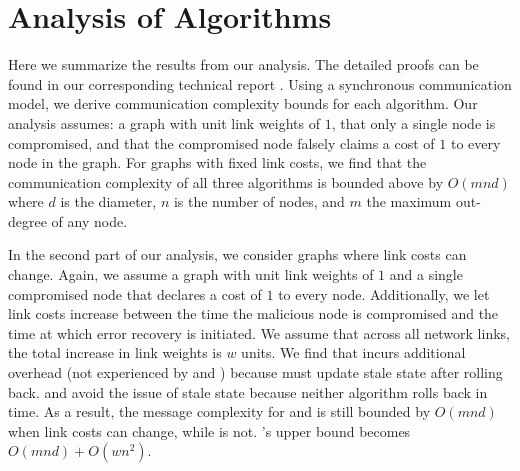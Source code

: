 
\section{Analysis of Algorithms}
\label{sec:analysis}

Here we summarize the results from our analysis.  The detailed proofs can be found in our corresponding technical report \cite{TechRollback10}. 
Using a synchronous communication model, we derive communication complexity bounds for each algorithm.  Our analysis assumes: a graph with unit link weights of $1$,
that only a single node is compromised, and that the compromised node
falsely claims a cost of $1$ to every node in the graph. 
For graphs with fixed link costs, we find that the communication complexity of all three algorithms is bounded above by $O(mnd)$  where $d$ is the diameter, $n$ is the number of nodes, and $m$ the maximum out-degree of any node.

In the second part of our analysis, we consider graphs where link costs can change. Again, we assume a graph with unit link weights of $1$ and a single compromised node that declares a cost of $1$ to every node.
Additionally, we let link costs increase between the time the malicious node is compromised and the time at which error recovery is initiated.  
We assume that across all network links, the total increase in link weights is $w$ units.
We find that \cpr incurs additional overhead (not experienced by \second and \purges) because \cpr must update stale state after rolling back. 
\second and \purge avoid the issue of stale state because neither algorithm rolls back in time.  As a result, the message complexity for \second and \purge is still bounded by
$O(mnd)$ when link costs can change, while \cpr is not. \cprs's upper bound becomes $O(mnd) + O(wn^2)$. 



